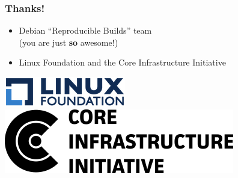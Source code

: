 \documentclass[14pt]{beamer}
\begin{document}
\begin{frame}
 \frametitle{Thanks!}

 \begin{itemize}
  \item Debian “Reproducible Builds” team \\
        {\small (you are just \textbf{so} awesome!)}
  \item Linux Foundation and the Core Infrastructure Initiative
\end{itemize}

 \begin{center}
  \includegraphics[height=0.1\paperheight]{images/linux_foundation_logo.png}
  \hspace{0.1\paperwidth}
  \includegraphics[height=0.1\paperheight]{images/cii_logo.png}
 \end{center}

 \vfill
 \begin{center}
 \end{center}
\end{frame}
\end{document}
